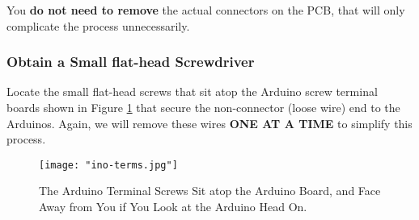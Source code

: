 \documentclass{article}
\begin{document}
You \textbf{do not need to remove} the actual connectors on the PCB, that will only complicate the process unnecessarily. 


\subsubsection{Obtain a Small flat-head Screwdriver}
Locate the small flat-head screws that sit atop the Arduino screw terminal boards shown in Figure \ref{fig:ino-terms} that secure the non-connector (loose wire) end to the 
Arduinos. Again, we will remove these wires \textbf{ONE AT A TIME} to simplify this process.

\begin{figure}[h!]
        \centering
        \texttt{[image: "ino-terms.jpg"]}
        \caption{The Arduino Terminal Screws Sit atop the Arduino Board, and Face Away from You if You Look at the Arduino Head On.}
        \label{fig:ino-terms}
\end{figure}
\FloatBarrier
\end{document}
